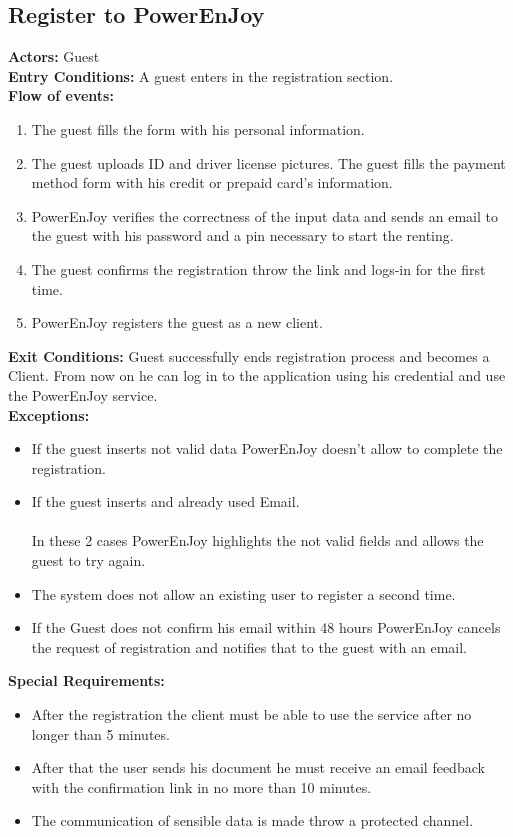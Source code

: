 \subsection{Register to PowerEnJoy}
%
\textbf{Actors:}
Guest\\
%
\textbf{Entry Conditions:}
A guest enters in the registration section.\\ 
%
\textbf{Flow of events:}
\begin{enumerate}
\item The guest fills the form with his personal information. 
\item The guest uploads ID and driver license pictures. The guest fills the payment method form with his credit or prepaid card's information. 
\item PowerEnJoy verifies the correctness of the input data and sends an email to the guest with his password and a pin necessary to start the renting. 
\item The guest confirms the registration throw the link and logs-in for the first time.
\item PowerEnJoy registers the guest as a new client. 
\end{enumerate}
%
\textbf{Exit Conditions:}
Guest successfully ends registration process and becomes a Client. From now on he can log in to the application using his credential and use the PowerEnJoy service. \\ 
%
\textbf{Exceptions:}
\begin{itemize}
\item If the guest inserts not valid data PowerEnJoy doesn't allow to complete the registration.
\item If the guest inserts and already used Email.
\\
\\In these 2 cases PowerEnJoy highlights the not valid fields and allows the guest to try again.
\item The system does not allow an existing user to register a second time.
\item If the Guest does not confirm his email within 48 hours PowerEnJoy cancels the request of registration and notifies that to the guest with an email.
\end{itemize}
%
\textbf{Special Requirements:}
\begin{itemize}
\item After the registration the client must be able to use the service after no longer than 5 minutes.
\item After that the user sends his document he must receive an email feedback with the confirmation link in no more than 10 minutes.
\item The communication of sensible data is made throw a protected channel.
\end{itemize}

